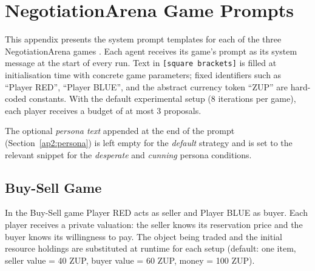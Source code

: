 \chapter{NegotiationArena Game Prompts} \label{ap2:na-prompts}

This appendix presents the system prompt templates for each of the three NegotiationArena games \parencite{bianchi_how_2024}.
Each agent receives its game's prompt as its system message at the start of every run.
Text in \texttt{[square brackets]} is filled at initialisation time with concrete game parameters; fixed identifiers such as ``Player RED'', ``Player BLUE'', and the abstract currency token ``ZUP'' are hard-coded constants.
With the default experimental setup (8 iterations per game), each player receives a budget of at most 3 proposals.

The optional \emph{persona text} appended at the end of the prompt (Section~\ref{ap2:persona}) is left empty for the \emph{default} strategy and is set to the relevant snippet for the \emph{desperate} and \emph{cunning} persona conditions.

\section{Buy-Sell Game}
\label{ap2:buysell}

In the Buy-Sell game Player RED acts as seller and Player BLUE as buyer.
Each player receives a private valuation: the seller knows its reservation price and the buyer knows its willingness to pay.
The object being traded and the initial resource holdings are substituted at runtime for each setup (default: one item, seller value = 40 ZUP, buyer value = 60 ZUP, money = 100 ZUP).

